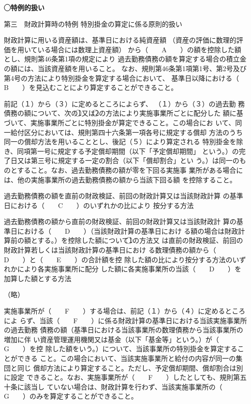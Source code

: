 \begin{fillblank}[数理人試験 2021 問題1 設問1 改題]
    \noindent \textbf{◯特例的扱い}
  \begin{lawstructure}
    \begin{lawarticle}{第三　財政計算時の特例}{}
      特別掛金の算定に係る原則的扱い

      財政計算に用いる資産額は、基準日における純資産額
      （資産の評価に数理的評価を用いている場合には数理上資産額）
      から（　　A　　）の額を控除した額とし、規則第46条第1項の規定により
      過去勤務債務の額を算定する場合の積立金の額には、当該資産額を用いること。
      なお、規則第46条第1項第1号、第2号及び第4号の方法により特別掛金を算定する場合において、
      基準日以降における（　　B　　）を見込むことにより算定することができること。


      前記（１）から（３）に定めるところによらず、 （１）から（３）の過去勤
務債務の額について、次の\textcircled{1}又は\textcircled{2}の方法により実施事業所ごとに配分した
額に基づいて、実施事業所ごとに特別掛金が算定できること。この場合にお
いて、同一給付区分においては、規則第四十六条第一項各号に規定する償却
方法のうち同一の償却方法を用いることとし、後記（５）により算定される
特別掛金を除き、同項第一号に規定する予定償却期間（以下「予定償却期間」
という。）の完了日又は第三号に規定する一定の割合（以下「償却割合」とい
う。）は同一のものとすること。なお、過去勤務債務の額が零を下回る実施事
業所がある場合には、他の実施事業所の過去勤務債務の額から当該下回る額
を控除すること。

      過去勤務債務の額を直前の財政検証、前回の財政計算又は当該財政計算
の基準日における（　　C　　）のいずれかの比により
按分する方法

      過去勤務債務の額から直前の財政検証、前回の財政計算又は当該財政計
算の基準日における（　　D　　）（当該財政計算の基準日におけ
る額の場合は財政計算前の額とする。）を控除した額について\textcircled{1}の方法又
は直前の財政検証、前回の財政計算若しくは当該財政計算の基準日におけ
る数理債務の額から（　　D　　）と（　　E　　）の合計額を控
除した額の比により按分する方法のいずれかにより各実施事業所に配分
した額に各実施事業所の当該（　　D　　）を加算した額とする方法
      
      （略）

実施事業所が（　　F　　）する場合は、前記（１）から（４）に定めるところによ
らず、当該（　　F　　）に係る財政計算の基準日における当該実施事業所の過去勤務
債務の額（基準日における当該事業所の数理債務から当該事業所の増加に伴
い資産管理運用機関又は基金（以下「基金等」という。）が（　　G　　）を控
除した額をいう。）について、当該事業所の特別掛金を算定することができる
こと。この場合において、当該実施事業所と給付の内容が同一の集団と同じ
償却方法により算定すること。ただし、予定償却期間、償却割合は別に設定
できること。なお、実施事業所が（　　F　　）したとしても、規則第五十条に該当し
ていない場合は、財政計算を行わず、当該実施事業所の（　　G　　）のみを算定することができること。


\end{lawarticle}
\end{lawstructure}
\end{fillblank}
